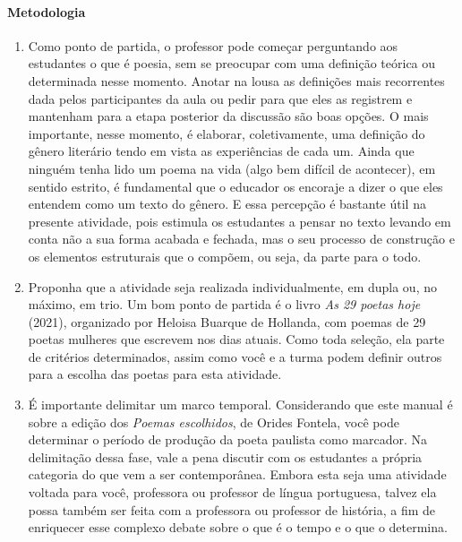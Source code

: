 \documentclass[12pt]{extarticle}
\begin{document}
\paragraph{Metodologia}
\begin{enumerate}
\item Como ponto de partida, o professor pode começar
perguntando aos estudantes o que é poesia, sem se preocupar com uma
definição teórica ou determinada nesse momento. Anotar na lousa as
definições mais recorrentes dada pelos participantes da aula ou pedir
para que eles as registrem e mantenham para a etapa posterior da
discussão são boas opções. O mais importante, nesse momento, é elaborar,
coletivamente, uma definição do gênero literário tendo em vista as
experiências de cada um. Ainda que ninguém tenha lido um poema na vida
(algo bem difícil de acontecer), em sentido estrito, é fundamental que o
educador os encoraje a dizer o que eles entendem como um texto do
gênero. E essa percepção é bastante útil na presente atividade, pois
estimula os estudantes a pensar no texto levando em conta não a sua
forma acabada e fechada, mas o seu processo de construção e os elementos
estruturais que o compõem, ou seja, da parte para o todo.

\item Proponha que a atividade seja realizada individualmente, em dupla ou,
no máximo, em trio. Um bom ponto de partida é o livro \emph{As 29 poetas
hoje} (2021), organizado por Heloisa Buarque de Hollanda, com poemas de
29 poetas mulheres que escrevem nos dias atuais. Como toda seleção, ela
parte de critérios determinados, assim como você e a turma podem definir
outros para a escolha das poetas para esta atividade.

\item É importante delimitar um marco temporal. Considerando que este
manual é sobre a edição dos \emph{Poemas escolhidos}, de Orides Fontela,
você pode determinar o período de produção da poeta paulista como
marcador. Na delimitação dessa fase, vale a pena discutir com os
estudantes a própria categoria do que vem a ser contemporânea. Embora
esta seja uma atividade voltada para você, professora ou professor de
língua portuguesa, talvez ela possa também ser feita com a professora ou
professor de história, a fim de enriquecer esse complexo debate sobre o
que é o tempo e o que o determina.


\end{enumerate}
\end{document}
